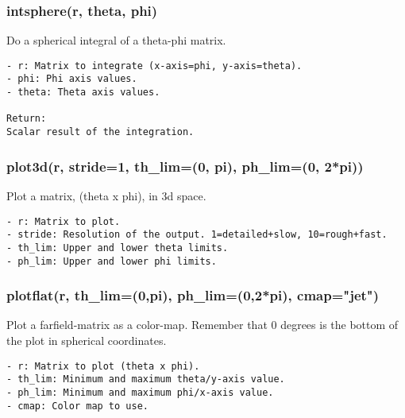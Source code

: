 \subsubsection{intsphere(r, theta, phi)}
Do a spherical integral of a theta-phi matrix.

\begin{verbatim}
- r: Matrix to integrate (x-axis=phi, y-axis=theta).
- phi: Phi axis values.
- theta: Theta axis values.

Return:
Scalar result of the integration.
\end{verbatim}

\subsubsection{plot3d(r, stride=1, th\_lim=(0, pi), ph\_lim=(0, 2*pi))}
Plot a matrix, (theta x phi), in 3d space.

\begin{verbatim}
- r: Matrix to plot.
- stride: Resolution of the output. 1=detailed+slow, 10=rough+fast.
- th_lim: Upper and lower theta limits.
- ph_lim: Upper and lower phi limits.
\end{verbatim}

\subsubsection{plotflat(r, th\_lim=(0,pi), ph\_lim=(0,2*pi), cmap="jet")}
Plot a farfield-matrix as a color-map. Remember that 0 degrees is the bottom
of the plot in spherical coordinates.

\begin{verbatim}
- r: Matrix to plot (theta x phi).
- th_lim: Minimum and maximum theta/y-axis value.
- ph_lim: Minimum and maximum phi/x-axis value.
- cmap: Color map to use.
\end{verbatim}

